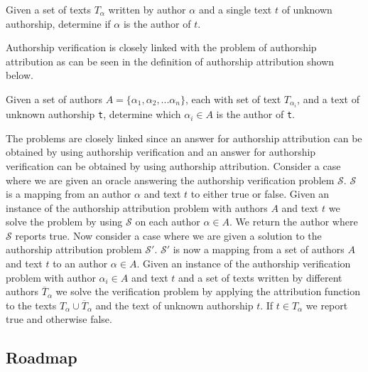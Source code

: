\begin{definition}
    \label{def:authorship_verification}

    Given a set of texts $T_\alpha$ written by author $\alpha$ and a single text
    $t$ of unknown authorship, determine if $\alpha$ is the author of $t$.

\end{definition}

Authorship verification is closely linked with the problem of authorship
attribution as can be seen in the definition of authorship attribution shown
below.

\begin{definition}

    Given a set of authors $A = \{\alpha_1, \alpha_2,...\alpha_n\}$, each with
    set of text $T_{\alpha_i}$, and a text of unknown authorship \texttt{t},
    determine which $\alpha_i \in A$ is the author of \texttt{t}.

\end{definition}

The problems are closely linked since an answer for authorship attribution
can be obtained by using authorship verification and an answer for authorship
verification can be obtained by using authorship attribution. Consider a case
where we are given an oracle answering the authorship verification problem
$\mathcal{S}$. $\mathcal{S}$ is a mapping from an author $\alpha$ and text $t$
to either true or false. Given an instance of the authorship attribution problem
with authors $A$ and text $t$ we solve the problem by using $\mathcal{S}$ on
each author $\alpha \in A$. We return the author where $\mathcal{S}$ reports
true. Now consider a case where we are given a solution to the authorship
attribution problem $\mathcal{S}'$. $\mathcal{S}'$ is now a mapping from a set
of authors $A$ and text $t$ to an author $\alpha \in A$. Given an instance of
the authorship verification problem with author $\alpha_i \in A$ and text $t$
and a set of texts written by different authors $\overline{T}_{\alpha}$ we solve
the verification problem by applying the attribution function to the texts
$T_{\alpha} \cup \overline{T}_{\alpha}$ and the text of unknown authorship $t$.
If $t \in T_{\alpha}$ we report true and otherwise false.


\subsection{Roadmap}

